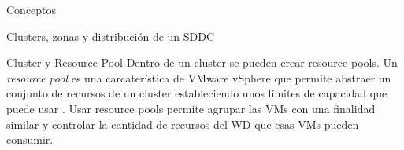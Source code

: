 \begin{section}{Conceptos}
\begin{subsection}{Clusters, zonas y distribución de un SDDC}
\begin{subsubsection}{Cluster y Resource Pool}
Dentro de un cluster se pueden crear resource pools. Un \textit{resource pool} es una carcaterística de VMware vSphere que permite abstraer un conjunto de recursos de un cluster estableciendo unos límites de capacidad que puede usar \cite{resourcePool}. Usar resource pools permite agrupar las VMs con una finalidad similar y controlar la cantidad de recursos del WD que esas VMs pueden consumir.

\end{subsubsection}
\end{subsection}

\end{section}

